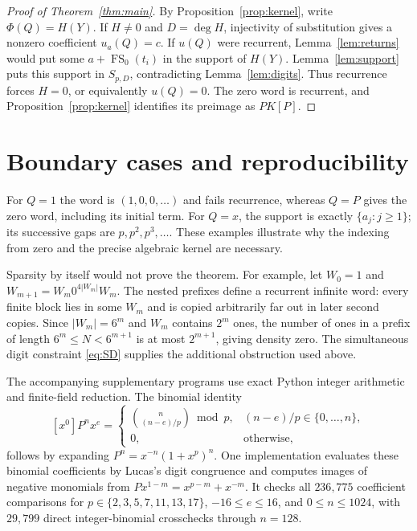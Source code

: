 \documentclass[11pt]{article}
\theoremstyle{remark}
\DeclareMathOperator{\FS}{FS}
\begin{document}
\begin{proof}[Proof of Theorem~\ref{thm:main}]
By Proposition~\ref{prop:kernel}, write $\Phi(Q)=H(Y)$.
If $H\ne0$ and $D=\deg H$, injectivity of substitution gives a nonzero
coefficient $u_a(Q)=c$.
If $u(Q)$ were recurrent, Lemma~\ref{lem:returns} would put some
$a+\FS_0(t_i)$ in the support of $H(Y)$.
Lemma~\ref{lem:support} puts this support in $S_{p,D}$, contradicting
Lemma~\ref{lem:digits}. Thus recurrence forces $H=0$, or equivalently
$u(Q)=0$. The zero word is recurrent, and Proposition~\ref{prop:kernel}
identifies its preimage as $P K[P]$.
\end{proof}

\section{Boundary cases and reproducibility}

For $Q=1$ the word is $(1,0,0,\ldots)$ and fails recurrence, whereas
$Q=P$ gives the zero word, including its initial term.
For $Q=x$, the support is exactly $\{a_j:j\geq1\}$; its successive gaps
are $p,p^2,p^3,\ldots$. These examples illustrate why the indexing from
zero and the precise algebraic kernel are necessary.

Sparsity by itself would not prove the theorem. For example, let $W_0=1$
and $W_{m+1}=W_m0^{4|W_m|}W_m$. The nested prefixes define a recurrent
infinite word: every finite block lies in some $W_m$ and is copied
arbitrarily far out in later second copies. Since $|W_m|=6^m$ and
$W_m$ contains $2^m$ ones, the number of ones in a prefix of length
$6^m\leq N<6^{m+1}$ is at most $2^{m+1}$, giving density zero.
The simultaneous digit constraint \eqref{eq:SD} supplies the additional
obstruction used above.

The accompanying supplementary programs use exact Python integer
arithmetic and finite-field reduction. The binomial identity
\begin{equation}\label{eq:binomial}
 [x^0]P^n x^e=
 \begin{cases}
 \displaystyle\binom{n}{(n-e)/p}\bmod p,
    & (n-e)/p\in\{0,\ldots,n\},\\
 0,&\text{otherwise},
 \end{cases}
\end{equation}
follows by expanding $P^n=x^{-n}(1+x^p)^n$.
One implementation evaluates these binomial coefficients by Lucas's digit
congruence \cite[Theorem~1.1]{LaugierSaikia2012} and computes images of
negative monomials from
$P x^{1-m}=x^{p-m}+x^{-m}$. It checks all $236{,}775$ coefficient
comparisons for $p\in\{2,3,5,7,11,13,17\}$, $-16\leq e\leq16$,
and $0\leq n\leq1024$, with $29{,}799$ direct integer-binomial
crosschecks through $n=128$.
\end{document}
